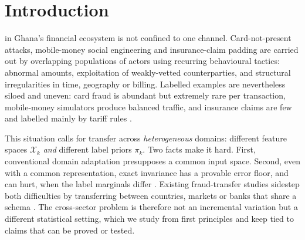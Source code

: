 \documentclass[journal]{IEEEtran}
\newcommand{\1}{\mathbf{1}}
\newcommand{\Xspace}{\mathcal{X}}
\begin{document}
\section{Introduction}
 in Ghana's financial ecosystem is not confined to one channel. Card-not-present attacks, mobile-money social engineering and insurance-claim padding are carried out by overlapping populations of actors using recurring behavioural tactics: abnormal amounts, exploitation of weakly-vetted counterparties, and structural irregularities in time, geography or billing. Labelled examples are nevertheless siloed and uneven: card fraud is abundant but extremely rare per transaction, mobile-money simulators produce balanced traffic, and insurance claims are few and labelled mainly by tariff rules \cite{sowah2019dss,azamuke2022momtsim}.

This situation calls for transfer across \emph{heterogeneous} domains: different feature spaces $\Xspace_k$ \emph{and} different label priors $\pi_k$. Two facts make it hard. First, conventional domain adaptation presupposes a common input space. Second, even with a common representation, exact invariance has a provable error floor, and can hurt, when the label marginals differ \cite{zhao2019invariant}. Existing fraud-transfer studies sidestep both difficulties by transferring between countries, markets or banks that share a schema \cite{lebichot2021transfer,siblini2021transfer,zhu2020hen,pereira2025evaluating,zheng2020federated}. The cross-sector problem is therefore not an incremental variation but a different statistical setting, which we study from first principles and keep tied to claims that can be proved or tested.
\end{document}
